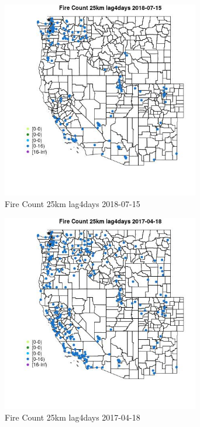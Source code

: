 \begin{figure} 
\centering  
\includegraphics[width=0.77\textwidth]{Code_Outputs/Report_ML_input_PM25_Step4_part_e_de_duplicated_aves_compiled_2019-05-21wNAs_MapObsFire_Count_25km_lag4days2018-07-15.jpg} 
\caption{\label{fig:Report_ML_input_PM25_Step4_part_e_de_duplicated_aves_compiled_2019-05-21wNAsMapObsFire_Count_25km_lag4days2018-07-15}Fire Count 25km lag4days 2018-07-15} 
\end{figure} 
 

\begin{figure} 
\centering  
\includegraphics[width=0.77\textwidth]{Code_Outputs/Report_ML_input_PM25_Step4_part_e_de_duplicated_aves_compiled_2019-05-21wNAs_MapObsFire_Count_25km_lag4days2017-04-18.jpg} 
\caption{\label{fig:Report_ML_input_PM25_Step4_part_e_de_duplicated_aves_compiled_2019-05-21wNAsMapObsFire_Count_25km_lag4days2017-04-18}Fire Count 25km lag4days 2017-04-18} 
\end{figure} 
 

